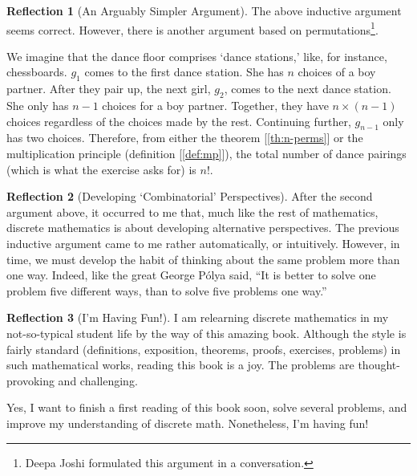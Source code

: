 \documentclass[11pt]{book}
\theoremstyle{definition}
\theoremstyle{plain}
\theoremstyle{definition}
\theoremstyle{problemstyle}
\theoremstyle{remark}
\theoremstyle{definition}
\newtheorem{reflection}{Reflection}
\begin{document}
\begin{reflection}[An Arguably Simpler Argument]
    The above inductive argument seems correct. However, there is another argument based on permutations\footnote{Deepa Joshi formulated this argument in a conversation.}.

    We imagine that the dance floor comprises `dance stations,' like, for instance, chessboards. $g_1$ comes to the first dance station. She has $n$ choices of a boy partner. After they pair up, the next girl, $g_2$, comes to the next dance station. She only has $n-1$ choices for a boy partner. Together, they have $n\times(n-1)$ choices regardless of the choices made by the rest. Continuing further, $g_{n-1}$ only has two choices. Therefore, from either the theorem [\ref{th:n-perms}] or the multiplication principle (definition [\ref{def:mp}]), the total number of dance pairings (which is what the exercise asks for) is $n!$.
\end{reflection}
\begin{reflection}[Developing `Combinatorial' Perspectives]

    After the second argument above, it occurred to me that, much like the rest of mathematics, discrete mathematics is about developing alternative perspectives. The previous inductive argument came to me rather automatically, or intuitively. However, in time, we must develop the habit of thinking about the same problem more than one way. Indeed, like the great George P\'olya said, ``It is better to solve one problem five different ways, than to solve five problems one way.''  
\end{reflection}
\begin{reflection}[I'm Having Fun!]
    I am relearning discrete mathematics in my not-so-typical student life by the way of this amazing book. Although the style is fairly standard (definitions, exposition, theorems, proofs, exercises, problems) in such mathematical works, reading this book is a joy. The problems are thought-provoking and challenging.

    Yes, I want to finish a first reading of this book soon, solve several problems, and improve my understanding of discrete math. Nonetheless, I'm having fun!

\end{reflection}
\end{document}
